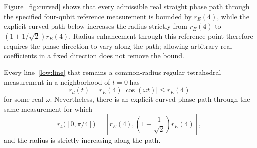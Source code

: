 Figure~\ref{fig:curved} shows that every admissible real straight phase path through the specified four-qubit reference measurement is bounded by $r_E(4)$, while the explicit curved path below increases the radius strictly from $r_E(4)$ to $(1+1/\sqrt2)r_E(4)$. Radius enhancement through this reference point therefore requires the phase direction to vary along the path; allowing arbitrary real coefficients in a fixed direction does not remove the bound.

\begin{theorem}[Straight-path bound and a curved path at $n=4$]
\label{low:theorem}
Every line~\eqref{low:line} that remains a common-radius regular
tetrahedral measurement in a neighborhood of $t=0$ has
\begin{equation}
 r_d(t)=r_E(4)|\cos(\omega t)|\le r_E(4)
 \label{low:line-bound}
\end{equation}
for some real $\omega$.  Nevertheless, there is an explicit curved phase
path through the same measurement for which
\begin{equation}
 r_4\bigl([0,\pi/4]\bigr)
 =\left[r_E(4),\left(1+\frac1{\sqrt2}\right)r_E(4)\right],
 \label{low:curve-range}
\end{equation}
and the radius is strictly increasing along the path.
\end{theorem}

